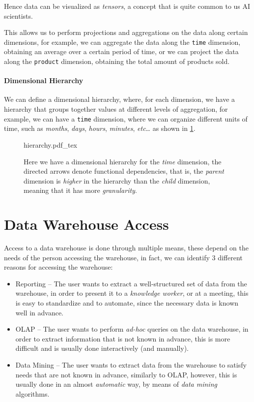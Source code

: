 \documentclass[openright, twoside, twocolumn]{report}
\newcommand{\incsvg}[2]{%
	\def\svgwidth{\columnwidth}
	{#2.pdf_tex}%
}
\begin{document}
Hence data can be visualized as \emph{tensors}, a concept that is
quite common to us AI scientists.

This allows us to perform projections and aggregations on the data
along certain dimensions, for example, we can aggregate
the data along the \texttt{time} dimension, obtaining
an average over a certain period of time, or we can
project the data along the \texttt{product} dimension, obtaining
the total amount of products sold.

\paragraph{Dimensional Hierarchy}

We can define a dimensional hierarchy, where, for each dimension, we
have a hierarchy that groups together values at different
levels of aggregation, for example, we can have a \texttt{time}
dimension, where we can organize different units of time, such as
\emph{months}, \emph{days}, \emph{hours}, \emph{minutes}, \emph{etc}\dots\@
as shown in \cref{fig:hierarchy}.


\begin{figure}[h!]
	\centering
	\incsvg{fig}{hierarchy}\\
	\caption{Here we have a dimensional hierarchy for the
  \emph{time} dimension, the directed arrows denote functional
  dependencies, that is, the \emph{parent} dimension is
  \emph{higher} in the hierarchy than the \emph{child} dimension, meaning
  that it has more \emph{granularity}.}\label{fig:hierarchy}%
\end{figure}

\section{Data Warehouse Access}

Access to a data warehouse is done through multiple means, these depend on the 
needs of the person accessing the warehouse, in fact, we can identify 3 different
reasons for accessing the warehouse:

\begin{itemize}
  \item Reporting -- The user wants to extract a well-structured set of data from the 
  warehouse, in order to present it to a \emph{knowledge worker}, or at a meeting, 
  this is easy to standardize and to automate, since the necessary data is known 
  well in advance.
  \item OLAP -- The user wants to perform \emph{ad-hoc} queries on the data warehouse,
  in order to extract information that is not known in advance, this is more difficult
  and is usually done interactively (and manually).
  \item Data Mining -- The user wants to extract data from the warehouse to satisfy needs 
  that are not known in advance, similarly to OLAP, however, this is usually done in 
  an almost \emph{automatic} way, by means of \emph{data mining} algorithms.
\end{itemize}
\end{document}
